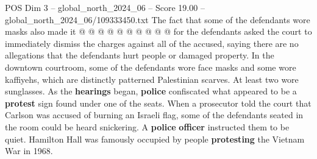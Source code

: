 \begin{textsample}{POS Dim 3 – global\_north\_2024\_06 – Score 19.00 – global\_north\_2024\_06/109333450.txt}
The fact that some of the defendants wore masks also made it @ @ @ @ @ @ @ @ @ @ for the defendants asked the court to immediately dismiss the charges against all of the accused, saying there are no allegations that the defendants hurt people or damaged property.
In the downtown courtroom, some of the defendants wore face masks and some wore kaffiyehs, which are distinctly patterned Palestinian scarves.
At least two wore sunglasses.
As the \textbf{hearings} began, \textbf{police} confiscated what appeared to be a \textbf{protest} sign found under one of the seats.
When a prosecutor told the court that Carlson was accused of burning an Israeli flag, some of the defendants seated in the room could be heard snickering.
A \textbf{police} \textbf{officer} instructed them to be quiet.
Hamilton Hall was famously occupied by people \textbf{protesting} the Vietnam War in 1968.

\end{textsample}
